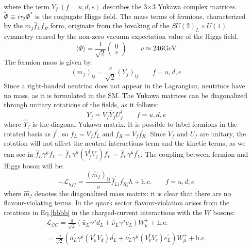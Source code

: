 where the term $Y_f \ (f  =  u,d,e)$ describes the 3$\times$3 
Yukawa complex matrices. $\widetilde{\Phi} \equiv i \tau_2 \Phi^*$ 
is the conjugate Higgs field. The mass terms of fermions, 
characterized by the $m_f \bar{f}_L f_R$ form, originate 
from the breaking of the $SU(2)_L \times U(1)$ symmetry 
caused by the non-zero vacuum expectation value of the Higgs field.
\begin{equation}\label{higgs}
\langle\Phi\rangle=\frac{1}{\sqrt{2}}\left(\begin{array}{l}
0 \\
v
\end{array}\right) \qquad v \simeq 246 \mathrm{GeV}
\end{equation}
The fermion mass is given by:
\begin{equation}
\left(m_f\right)_{i j}=\frac{v}{\sqrt{2}}\left(Y_f\right)_{i j} \qquad f=u, d, e
\end{equation}
Since a right-handed neutrino does not appear in the 
Lagrangian, neutrinos have no mass, as it is formulated 
in the SM. The Yukawa matrices can be diagonalized 
through unitary rotations of the fields, as it follows:
\begin{equation}\label{bbbb}
Y_f=V_f \hat{Y}_f U_f^{\dagger} \qquad f=u, d, e
\end{equation}
where $ \hat{Y}_f $ is the diagonal Yukawa matrix. 
It is possible to label fermions in the rotated basis 
as $f^{\prime}$, so $f_L=V_f f^{\prime}_L$ and $f_R=V_f f^{\prime}_R $. 
Since $V_f$ and $U_f$ are unitary, the rotation will not affect the 
neutral interactions term and the kinetic terms, as we can see 
in $\bar{f}_L \gamma^\mu f_L=\bar{f}_L \gamma^\mu\left(V_f^{\dagger} V_f\right) f_L=\bar{f}_L^{\prime} \gamma^\mu f_L^{\prime}$. 
The coupling between fermion and Higgs boson will be:
\begin{equation}
-\mathscr{L}_{h \bar{f} f}=\frac{(\hat{m}_f)_{i j}}{v} \bar{f}_{L i}^{\prime}f^{\prime}_{R j} h+\text{h.c.} \qquad f=u, d, e
\end{equation}
where $\hat{m}_f$ denotes the diagonalized mass matrix: it is clear that there are no flavour-violating terms.
In the quark sector flavour-violation arises from the rotations 
in Eq.\ref{bbbb} in the charged-current interactions with the $W$ bosons:
\begin{equation}\label{quarkviolation}
\begin{array}{c}
      { \displaystyle 
\mathscr{L}_{C C}  =\frac{g}{\sqrt{2}}\left(\bar{u}_L \gamma^\mu d_L+\bar{\nu}_L \gamma^\mu e_L\right) W_\mu^{+}+\text {h.c.} }\\
 {\displaystyle=\frac{g}{\sqrt{2}}\left(\bar{u}^{\prime}_L \gamma^\mu\left(V_u^{\dagger} V_d\right) d_L^{\prime}+\bar{\nu}^{\prime}_L \gamma^\mu\left(V_\nu^{\dagger} V_e\right) e_L^{\prime}\right) W_\mu^{+}+\text {h.c.}}
\end{array}
\end{equation}


